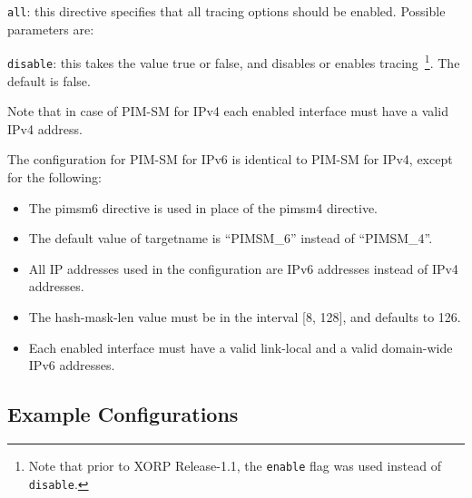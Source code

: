 \begin{description}
\begin{description}
\begin{description}
\item{\tt all}: this directive specifies that all tracing
  options should be enabled.  Possible parameters are:
\begin{description}
\item{\tt disable}: this takes the value {\stt true} or {\stt false},
  and disables or enables tracing~\footnote{Note
  that prior to XORP Release-1.1, the {\tt enable} flag was used instead of
  {\tt disable}.}. The default is {\stt false}.
\end{description}
\end{description}
\end{description}
\end{description}

Note that in case of PIM-SM for IPv4 each enabled interface must have a
valid IPv4 address.

The configuration for PIM-SM for IPv6 is identical to PIM-SM for IPv4,
except for the following:
\begin{itemize}
\item The {\stt pimsm6} directive is used in place of the
  {\stt pimsm4} directive.
\item The default value of {\stt targetname} is {\stt ``PIMSM\_6''}
  instead of {\stt ``PIMSM\_4''}.
\item All IP addresses used in the configuration are IPv6 addresses
  instead of IPv4 addresses.
\item The {\stt hash-mask-len} value must be in the interval [8, 128],
  and defaults to 126.
\item Each enabled interface must have a valid link-local and a valid
  domain-wide IPv6 addresses.
\end{itemize}

\newpage
\subsection{Example Configurations}

